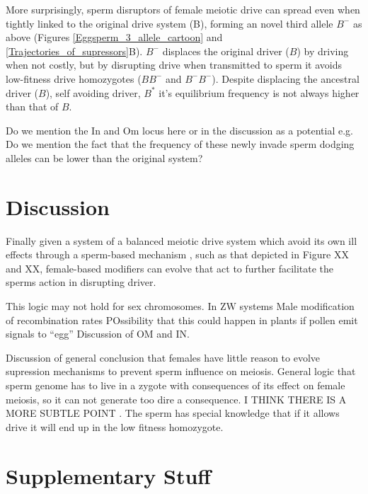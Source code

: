 \documentclass[12pt,letterpaper]{article}
\newcommand{\gc}[1]{{ \color{red} #1}}
\begin{document}
More surprisingly, sperm disruptors of female meiotic drive can spread
	even when tightly linked to the original drive system (B), forming
	an novel third allele $B^{-}$ as above 
	(Figures \ref{Eggsperm_3_allele_cartoon} and \ref{Trajectories_of_supressors}B). 
$B^{-}$ displaces the original driver ($B$) by driving when not costly, 
	but by disrupting drive when transmitted to sperm it avoids low-fitness drive homozygotes ($BB^-$ and $B^-B^-$). 
Despite displacing the ancestral driver ($B$), self avoiding driver, $B^*$ it's equilibrium frequency is not always higher than that of $B$. 

\gc{Do we mention the In and Om locus here or in the discussion as a
	 potential e.g. Do we mention the fact that the frequency of these
	 newly invade sperm dodging alleles can be lower than the original system?}\\

\section*{Discussion}


Finally given a system of a balanced meiotic drive system which avoid
its own ill effects through a sperm-based mechanism
, such as that depicted in Figure XX and XX, female-based modifiers 
can evolve that act to further facilitate the sperms action in
disrupting driver. 

This logic may not hold for sex chromosomes. In ZW systems 
 Male modification of recombination rates
POssibility that this could happen in plants if pollen emit signals to ``egg''
Discussion of OM and IN.

Discussion of general conclusion that females have little reason to evolve supression mechanisms to prevent sperm influence on meiosis. 
General logic that sperm genome has to live in a zygote with consequences of its effect on female meiosis, so
it can not generate too dire a consequence.
I THINK THERE IS A MORE SUBTLE POINT . The sperm has special knowledge
that if it allows drive it will end up in the low fitness homozygote. 



\section*{Supplementary Stuff}
\end{document}
